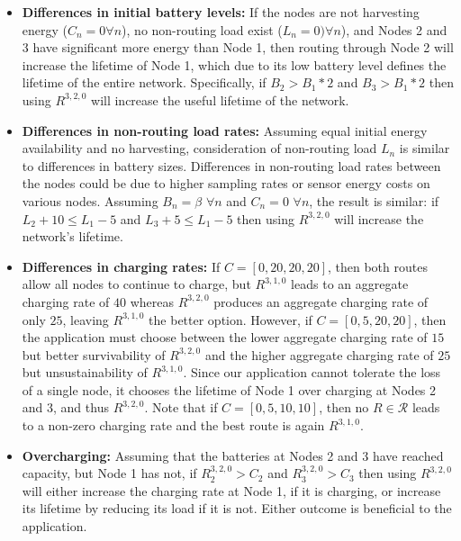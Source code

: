 \begin{itemize}

\item \textbf{Differences in initial battery levels:} If the nodes are not
harvesting energy ($C_n = 0 \forall n$), no non-routing load exist ($L_n = 0)
\forall n$), and Nodes 2 and 3 have significant more energy than Node 1, then
routing through Node 2 will increase the lifetime of Node 1, which due to its
low battery level defines the lifetime of the entire network. Specifically,
if $B_2 > B_1 * 2$ and $B_3 > B_1 * 2$ then using $R^{3,2,0}$ will increase
the useful lifetime of the network.

\item \textbf{Differences in non-routing load rates:} Assuming equal initial
energy availability and no harvesting, consideration of non-routing load
$L_n$ is similar to differences in battery sizes. Differences in non-routing
load rates between the nodes could be due to higher sampling rates or sensor
energy costs on various nodes. Assuming $B_n = \beta$ $\forall n$ and $C_n =
0$ $\forall n$, the result is similar: if $L_2 + 10 \le L_1 - 5$ and $L_3 + 5
\le L_1 - 5$ then using $R^{3,2,0}$ will increase the network's lifetime.

\item \textbf{Differences in charging rates:} If $C = [0, 20, 20, 20]$, then
both routes allow all nodes to continue to charge, but $R^{3,1,0}$ leads to
an aggregate charging rate of $40$ whereas $R^{3,2,0}$ produces an aggregate
charging rate of only $25$, leaving $R^{3,1,0}$ the better option. However,
if $C = [0, 5, 20, 20]$, then the application must choose between the lower
aggregate charging rate of $15$ but better survivability of $R^{3,2,0}$ and
the higher aggregate charging rate of $25$ but unsustainability of
$R^{3,1,0}$. Since our application cannot tolerate the loss of a single node,
it chooses the lifetime of Node 1 over charging at Nodes 2 and 3, and thus
$R^{3,2,0}$. Note that if $C = [0, 5, 10, 10]$, then no $R \in \mathcal{R}$
leads to a non-zero charging rate and the best route is again $R^{3,1,0}$.

\item \textbf{Overcharging:} Assuming that the batteries at Nodes 2 and 3
have reached capacity, but Node 1 has not, if $R^{3,2,0}_2 > C_2$ and
$R^{3,2,0}_3 > C_3$ then using $R^{3,2,0}$ will either increase the charging
rate at Node 1, if it is charging, or increase its lifetime by reducing its
load if it is not. Either outcome is beneficial to the application.

\end{itemize}

